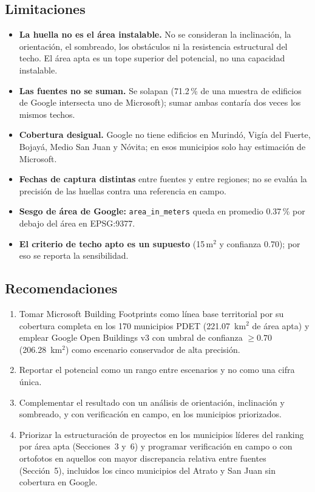 \subsection{Limitaciones}
\begin{itemize}
  \item \textbf{La huella no es el área instalable.} No se consideran la inclinación, la orientación, el sombreado, los obstáculos ni la resistencia estructural del techo. El área apta es un tope superior del potencial, no una capacidad instalable.
  \item \textbf{Las fuentes no se suman.} Se solapan (71.2\,\% de una muestra de edificios de Google intersecta uno de Microsoft); sumar ambas contaría dos veces los mismos techos.
  \item \textbf{Cobertura desigual.} Google no tiene edificios en Murindó, Vigía del Fuerte, Bojayá, Medio San Juan y Nóvita; en esos municipios solo hay estimación de Microsoft.
  \item \textbf{Fechas de captura distintas} entre fuentes y entre regiones; no se evalúa la precisión de las huellas contra una referencia en campo.
  \item \textbf{Sesgo de área de Google:} \texttt{area\_in\_meters} queda en promedio 0.37\,\% por debajo del área en EPSG:9377.
  \item \textbf{El criterio de techo apto es un supuesto} (15\,m$^2$ y confianza 0.70); por eso se reporta la sensibilidad.
\end{itemize}

\subsection{Recomendaciones}
\begin{enumerate}
  \item Tomar Microsoft Building Footprints como línea base territorial por su cobertura completa en los 170 municipios PDET (221.07~km$^2$ de área apta) y emplear Google Open Buildings v3 con umbral de confianza $\geq 0.70$ (206.28~km$^2$) como escenario conservador de alta precisión.
  \item Reportar el potencial como un rango entre escenarios y no como una cifra única.
  \item Complementar el resultado con un análisis de orientación, inclinación y sombreado, y con verificación en campo, en los municipios priorizados.
  \item Priorizar la estructuración de proyectos en los municipios líderes del ranking por área apta (Secciones~3 y~6) y programar verificación en campo o con ortofotos en aquellos con mayor discrepancia relativa entre fuentes (Sección~5), incluidos los cinco municipios del Atrato y San Juan sin cobertura en Google.
\end{enumerate}
